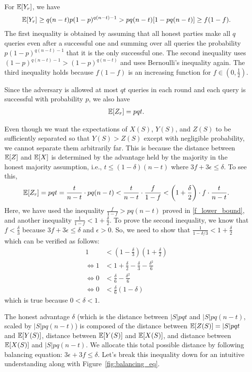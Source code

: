 For $\mathbb{E}[Y_r]$, we have
\begin{align}
\label{eq:y_lower_bound}
    \mathbb{E}[Y_r]  \geq q(n-t)p (1-p)^{q(n-t)-1} > pq(n-t)[1-pq(n-t)] \geq f (1-f).
\end{align}
The first inequality is obtained by assuming that all honest parties make all $q$ queries even after a successful one and summing over all queries the probability $p(1-p)^{q(n-t)-1}$ that it is the only successful one.
The second inequality uses $(1-p)^{q(n-t)-1} > (1-p)^{q(n-t)}$ and uses Bernoulli's inequality again.
The third inequality holds because $f(1-f)$ is an increasing function for $f \in (0,\frac12)$.

Since the adversary is allowed at most $qt$ queries in each round and each query is successful with probability $p$, we also have
\begin{align}
    \mathbb{E}[Z_r] = pqt.
\end{align}

Even though we want the expectations of $X(S)$, $Y(S)$, and $Z(S)$ to be sufficiently separated so that $Y(S) > Z(S)$ except with negligible probability, we cannot separate them arbitrarily far. This is because the distance between $\mathbb{E}[Z]$ and $\mathbb{E}[X]$ is determined by the advantage held by the majority in the honest majority assumption, i.e., $t \leq (1-\delta)(n-t)$ where $3f+3\epsilon \leq \delta$.
To see this,
\begin{align}
    \mathbb{E}[Z_r] = pqt = \frac{t}{n-t} \cdot pq(n-t) < \frac{t}{n-t} \cdot \frac{f}{1-f} < \left(1+\frac{\delta}{2}\right)\cdot f \cdot \frac{t}{n-t}.
\end{align}
Here, we have used the inequality $\frac{f}{1-f} > pq(n-t)$ proved in \eqref{f_lower_bound}, and another inequality $\frac{1}{1-f} < 1 + \frac{\delta}{2}$. To prove the second inequality, we know that $f < \frac{\delta}{3}$ because $3f+3\epsilon \leq \delta$ and $\epsilon>0$. So, we need to show that $\frac{1}{1-\delta/3} < 1+\frac{\delta}{2}$ which can be verified as follows:
\begin{align*}
    1 &< \left(1-\frac{\delta}{3}\right) \left(1+\frac{\delta}{2}\right) \\
    \iff 1 &< 1 + \frac{\delta}{2} - \frac{\delta}{3} - \frac{\delta^2}{6} \\
    \iff 0 &< \frac{\delta}{6} - \frac{\delta^2}{6} \\
    \iff 0 &< \frac{\delta}{6}(1-\delta)
\end{align*}
which is true because $0 < \delta < 1$.

The honest advantage $\delta$ (which is the distance between $|S|pqt$ and $|S|pq(n-t)$, scaled by $|S|pq(n-t)$) is composed of the distance between $\mathbb{E}[Z(S)]=|S|pqt$ and $\mathbb{E}[Y(S)]$, distance between $\mathbb{E}[Y(S)]$ and $\mathbb{E}[X(S)]$, and distance between $\mathbb{E}[X(S)]$ and $|S|pq(n-t)$. We allocate this total possible distance by following balancing equation: $3\epsilon + 3f \leq \delta$. Let's break this inequality down for an intuitive understanding along with Figure~\ref{fig:balancing_eq}.

